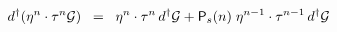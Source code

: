 \begin{equation}
{d^{\dagger}} ( \eta^n \cdot \tau^n {\cal{G}} ) \;\; = \;\; \eta^n \cdot \tau^n \, {d^{\dagger}} {\cal{G}} + {\textsf{P}}_s (n) \; \eta^{n-1} \cdot \tau^{n-1} \, {d^{\dagger}} {\cal{G}}
\label{eq:x17}
\end{equation}

